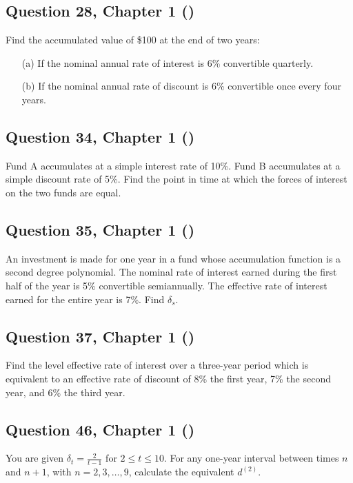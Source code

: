 \documentclass[12pt, a4paper]{article}
\begin{document}
\subsection*{Question 28, Chapter 1  (\cite{toi3rd})}
\noindent Find the accumulated value of \$100 at the end of two years:
\begin{enumerate}
    \item[(a)] If the nominal annual rate of interest is 6\% convertible quarterly.
    \item[(b)] If the nominal annual rate of discount is 6\% convertible once every four years.
\end{enumerate}

\subsection*{Question 34, Chapter 1  (\cite{toi3rd})}
\noindent Fund A accumulates at a simple interest rate of 10\%. Fund B accumulates at a simple discount rate of 5\%. Find the point in time at which the forces of interest on the two funds are equal.

\subsection*{Question 35, Chapter 1  (\cite{toi3rd})}
\noindent An investment is made for one year in a fund whose accumulation function is a second degree polynomial. The nominal rate of interest earned during the first half of the year is 5\% convertible semiannually. The effective rate of interest earned for the entire year is 7\%. Find \( \delta_s \).

\subsection*{Question 37, Chapter 1  (\cite{toi3rd})}
\noindent Find the level effective rate of interest over a three-year period which is equivalent to an effective rate of discount of 8\% the first year, 7\% the second year, and 6\% the third year.

\subsection*{Question 46, Chapter 1  (\cite{toi3rd})}
\noindent You are given \( \delta_t = \frac{2}{t-1} \) for \( 2 \leq t \leq 10 \). For any one-year interval between times \( n \) and \( n + 1 \), with \( n = 2, 3, \dots, 9 \), calculate the equivalent \( d^{(2)} \).
\end{document}
